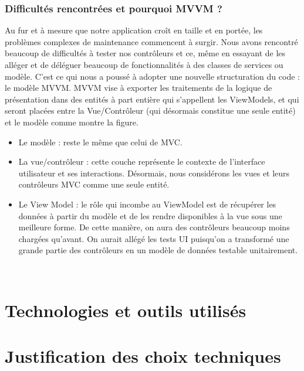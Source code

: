  \subsubsection{Difficultés rencontrées et pourquoi MVVM ?} %
 \label{ssub:difficultés_rencontrées_et_pourquoi_mvvm_}
 Au fur et à mesure que notre application croît en taille et en portée, les problèmes complexes de maintenance commencent à surgir. Nous avons rencontré beaucoup de difficultés à tester nos contrôleurs et ce, même en essayant de les alléger et de déléguer beaucoup de fonctionnalités à des classes de services ou modèle. C'est ce qui nous a poussé à adopter une nouvelle structuration du code : le modèle MVVM.\cite{mvvm}\newline
 MVVM vise à exporter les traitements de la logique de présentation dans des entités à part entière qui s'appellent les ViewModels, et qui seront placées entre la Vue/Contrôleur (qui désormais constitue une seule entité) et le modèle comme montre la figure.
 \begin{itemize}
 	\item Le modèle : reste le même que celui de MVC.{}
 	\item La vue/contrôleur : cette couche représente le contexte de l'interface utilisateur et ses interactions. Désormais, nous considérons les vues et leurs contrôleurs MVC comme une seule entité.
 	\item Le View Model : le rôle qui incombe au ViewModel est de récupérer les données à partir du modèle et de les rendre disponibles à la vue sous une meilleure forme. De cette manière, on aura des contrôleurs beaucoup moins chargées qu'avant. On aurait allégé les tests UI puisqu'on a transformé une grande partie des contrôleurs en un modèle de données testable unitairement. 
 \end{itemize}\

\section{Technologies et outils utilisés} %
\label{sec:technologies_et_outils_utilisés}


\section{Justification des choix techniques} %
\label{sec:justification_du_choix_technique}


